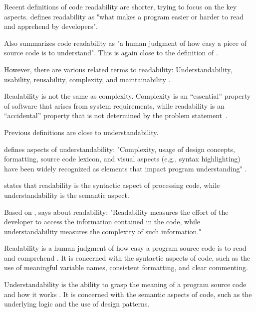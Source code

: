 \documentclass[%
class=scrreprt,
chapterprefix=false,%
open=right,%
twoside=false,%
paper=a4,%
logofile={Logo\_zentral\_farbig\_EN.png},%
thesistype=master,%
UKenglish,%
]{se2thesis}
\begin{document}
	Recent definitions of code readability are shorter, trying to focus on the key aspects. \citeauthor{oliveira2020evaluating} defines readability as "what makes a program easier or harder to read and apprehend by developers".
			
	Also \citeauthor{mi2021effectiveness} summarizes code readability as "a human judgment of how easy a piece of
	source code is to understand". This is again close to the definition of \citeauthor{buse2009learning}.
	
	However, there are various related terms to readability: Understandability, usability, reusability, complexity, and maintainability \citeauthor{tashtoush2013impact}. 
	
	Readability is not the same as complexity. Complexity is an “essential” property of software that arises
	from system requirements, while readability is an “accidental” property that is not determined by the problem statement~\cite{buse2009learning, brooks1987no}.
	
	Previous definitions are close to understandability.
	
	\citeauthor{scalabrino2018comprehensive} defines aspects of understandability: "Complexity, usage of design concepts, formatting, source code lexicon, and visual aspects (e.g., syntax highlighting) have been widely recognized as elements that impact program understanding" \cite{martin2009clean, wilson2007beautiful, beck2007implementation}.
	
	\citeauthor{posnett2011simpler} states that readability is the syntactic aspect of processing code, while understandability is the semantic aspect.
	
	Based on \citeauthor{posnett2011simpler}, \citeauthor{scalabrino2018comprehensive} says about readability: "Readability measures the effort of the developer to access the information contained in the code, while understandability measures the complexity of such information."
	
	Readability is a human judgment of how easy a program source code is to read and comprehend \cite{buse2008metric, sedano2016code}. It is concerned with the syntactic aspects of code, such as the use of meaningful variable names, consistent formatting, and clear commenting.
	
	Understandability is the ability to grasp the meaning of a program source code and how it works \cite{oliveira2020evaluating, posnett2011simpler}. It is concerned with the semantic aspects of code, such as the underlying logic and the use of design patterns.
	
\end{document}
